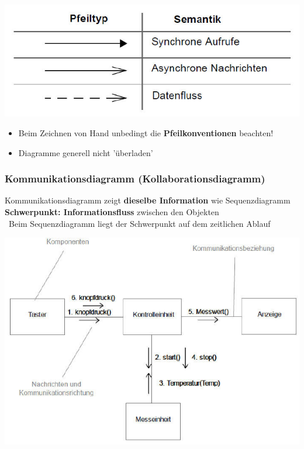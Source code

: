 \begin{minipage}[c]{0.45\columnwidth}
    \includegraphics[width=\columnwidth]{images/sequenzdiagramm_pfeile.pdf}
\end{minipage}
\hfill
\begin{minipage}[c]{0.52\columnwidth}
    \begin{itemize}
        \item Beim Zeichnen von Hand unbedingt die \textbf{Pfeilkonventionen} beachten!
        \item Diagramme generell nicht 'überladen'
    \end{itemize}
\end{minipage}


\subsubsection{Kommunikationsdiagramm (Kollaborationsdiagramm)}

\begin{outline}
    \1 Kommunikationsdiagramm zeigt \textbf{dieselbe Information} wie Sequenzdiagramm
    \1 \textbf{Schwerpunkt: Informationsfluss} zwischen den Objekten \\
    \textrightarrow\ Beim Sequenzdiagramm liegt der Schwerpunkt auf dem zeitlichen Ablauf
\end{outline}

\begin{center}
    \includegraphics[width=0.7\columnwidth]{images/kommunikationsdiagramm.pdf}
\end{center}


